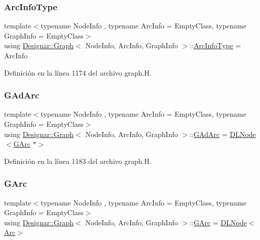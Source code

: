 \subsubsection{\texorpdfstring{Arc\+Info\+Type}{ArcInfoType}}
{\footnotesize\ttfamily template$<$typename Node\+Info , typename Arc\+Info  = Empty\+Class, typename Graph\+Info  = Empty\+Class$>$ \\
using \hyperlink{class_designar_1_1_graph}{Designar\+::\+Graph}$<$ Node\+Info, Arc\+Info, Graph\+Info $>$\+::\hyperlink{class_designar_1_1_graph_abc2adb4841a6d092d5093f9e60f2c8be}{Arc\+Info\+Type} =  Arc\+Info}



Definición en la línea 1174 del archivo graph.\+H.

\mbox{\label{class_designar_1_1_graph_a7d00558995946c5653522148b54971bc}} 
\subsubsection{\texorpdfstring{G\+Ad\+Arc}{GAdArc}}
{\footnotesize\ttfamily template$<$typename Node\+Info , typename Arc\+Info  = Empty\+Class, typename Graph\+Info  = Empty\+Class$>$ \\
using \hyperlink{class_designar_1_1_graph}{Designar\+::\+Graph}$<$ Node\+Info, Arc\+Info, Graph\+Info $>$\+::\hyperlink{class_designar_1_1_graph_a7d00558995946c5653522148b54971bc}{G\+Ad\+Arc} =  \hyperlink{class_designar_1_1_d_l_node}{D\+L\+Node}$<$\hyperlink{class_designar_1_1_graph_a5ad9e18b71899c2d4979426e367e5573}{G\+Arc} $\ast$$>$\hspace{0.3cm}{\ttfamily [protected]}}



Definición en la línea 1183 del archivo graph.\+H.

\mbox{\label{class_designar_1_1_graph_a5ad9e18b71899c2d4979426e367e5573}} 
\subsubsection{\texorpdfstring{G\+Arc}{GArc}}
{\footnotesize\ttfamily template$<$typename Node\+Info , typename Arc\+Info  = Empty\+Class, typename Graph\+Info  = Empty\+Class$>$ \\
using \hyperlink{class_designar_1_1_graph}{Designar\+::\+Graph}$<$ Node\+Info, Arc\+Info, Graph\+Info $>$\+::\hyperlink{class_designar_1_1_graph_a5ad9e18b71899c2d4979426e367e5573}{G\+Arc} =  \hyperlink{class_designar_1_1_d_l_node}{D\+L\+Node}$<$\hyperlink{class_designar_1_1_graph_a74c730ef4ce2d20f998d72bd25c2b5bf}{Arc}$>$\hspace{0.3cm}{\ttfamily [protected]}}



